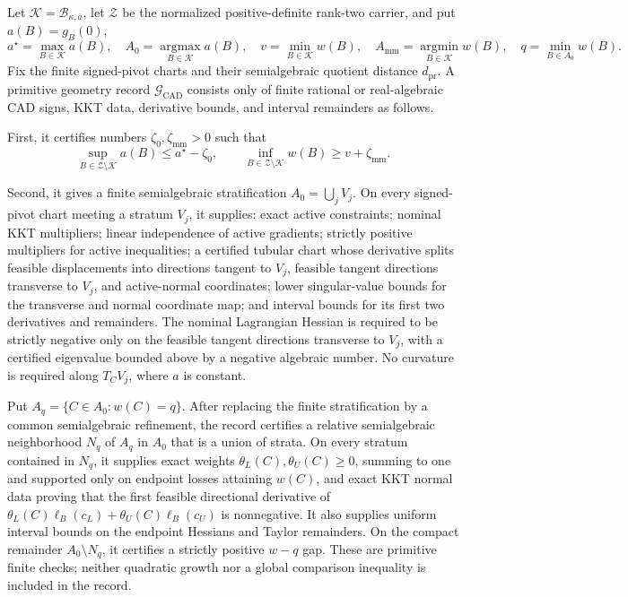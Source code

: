 Let \(\mathcal K=\mathcal B_{\kappa,\overline a}\), let \(\mathcal Z\) be the normalized positive-definite rank-two carrier, and put \(a(B)=g_B(0)\),
\[
a^\star=\max_{B\in\mathcal K}a(B),
\quad A_0=\operatorname*{argmax}_{B\in\mathcal K}a(B),
\quad v=\min_{B\in\mathcal K}w(B),
\quad A_{\mathrm{mm}}=\operatorname*{argmin}_{B\in\mathcal K}w(B),
\quad q=\min_{B\in A_0}w(B).
\]
Fix the finite signed-pivot charts and their semialgebraic quotient distance \(d_{\mathrm{pr}}\).  A primitive geometry record \(\mathscr G_{\mathrm{CAD}}\) consists only of finite rational or real-algebraic CAD signs, KKT data, derivative bounds, and interval remainders as follows.

First, it certifies numbers \(\zeta_0,\zeta_{\mathrm{mm}}>0\) such that
\[
\sup_{B\in\mathcal Z\setminus\mathcal K}a(B)
\le a^\star-\zeta_0,
\qquad
\inf_{B\in\mathcal Z\setminus\mathcal K}w(B)
\ge v+\zeta_{\mathrm{mm}}.
\tag{G1}
\]

Second, it gives a finite semialgebraic stratification \(A_0=\bigcup_j V_j\).  On every signed-pivot chart meeting a stratum \(V_j\), it supplies: exact active constraints; nominal KKT multipliers; linear independence of active gradients; strictly positive multipliers for active inequalities; a certified tubular chart whose derivative splits feasible displacements into directions tangent to \(V_j\), feasible tangent directions transverse to \(V_j\), and active-normal coordinates; lower singular-value bounds for the transverse and normal coordinate map; and interval bounds for its first two derivatives and remainders.  The nominal Lagrangian Hessian is required to be strictly negative only on the feasible tangent directions transverse to \(V_j\), with a certified eigenvalue bounded above by a negative algebraic number.  No curvature is required along \(T_CV_j\), where \(a\) is constant.

Put \(A_q=\{C\in A_0:w(C)=q\}\).  After replacing the finite stratification by a common semialgebraic refinement, the record certifies a relative semialgebraic neighborhood \(N_q\) of \(A_q\) in \(A_0\) that is a union of strata.  On every stratum contained in \(N_q\), it supplies exact weights \(\theta_L(C),\theta_U(C)\ge0\), summing to one and supported only on endpoint losses attaining \(w(C)\), and exact KKT normal data proving that the first feasible directional derivative of \(\theta_L(C)\ell_B(c_L)+\theta_U(C)\ell_B(c_U)\) is nonnegative.  It also supplies uniform interval bounds on the endpoint Hessians and Taylor remainders.  On the compact remainder \(A_0\setminus N_q\), it certifies a strictly positive \(w-q\) gap.  These are primitive finite checks; neither quadratic growth nor a global comparison inequality is included in the record.

